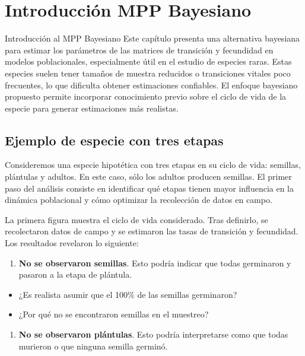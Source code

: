 \documentclass[
  12pt,
  letterpaper,
]{book}
\providecommand{\tightlist}{%
  \setlength{\itemsep}{0pt}\setlength{\parskip}{0pt}}\usepackage{longtable,booktabs,array}
\begin{document}
\section{Introducción MPP
Bayesiano}\label{introducciuxf3n-mpp-bayesiano}

Introducción al MPP Bayesiano Este capítulo presenta una alternativa
bayesiana para estimar los parámetros de las matrices de transición y
fecundidad en modelos poblacionales, especialmente útil en el estudio de
especies raras. Estas especies suelen tener tamaños de muestra reducidos
o transiciones vitales poco frecuentes, lo que dificulta obtener
estimaciones confiables. El enfoque bayesiano propuesto permite
incorporar conocimiento previo sobre el ciclo de vida de la especie para
generar estimaciones más realistas.

\subsection{Ejemplo de especie con tres
etapas}\label{ejemplo-de-especie-con-tres-etapas}

Consideremos una especie hipotética con tres etapas en su ciclo de vida:
semillas, plántulas y adultos. En este caso, sólo los adultos producen
semillas. El primer paso del análisis consiste en identificar qué etapas
tienen mayor influencia en la dinámica poblacional y cómo optimizar la
recolección de datos en campo.

La primera figura muestra el ciclo de vida considerado. Tras definirlo,
se recolectaron datos de campo y se estimaron las tasas de transición y
fecundidad. Los resultados revelaron lo siguiente:

\begin{enumerate}
\def\labelenumi{\arabic{enumi}.}
\tightlist
\item
  \textbf{No se observaron semillas}. Esto podría indicar que todas
  germinaron y pasaron a la etapa de plántula.
\end{enumerate}

\begin{itemize}
\tightlist
\item
  ¿Es realista asumir que el 100\% de las semillas germinaron?
\item
  ¿Por qué no se encontraron semillas en el muestreo?
\end{itemize}

\begin{enumerate}
\def\labelenumi{\arabic{enumi}.}
\setcounter{enumi}{1}
\tightlist
\item
  \textbf{No se observaron plántulas}. Esto podría interpretarse como
  que todas murieron o que ninguna semilla germinó.
\end{enumerate}
\end{document}
